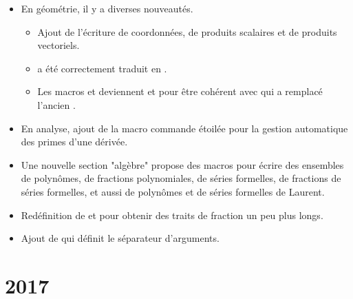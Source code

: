 \documentclass[12pt,a4paper]{book}
\begin{document}
\begin{description}
\begin{itemize}[itemsep=.5em]


    \item En géométrie, il y a diverses nouveautés.
    \begin{itemize}[itemsep=.5em]
        \item Ajout de l'écriture de coordonnées, de produits scalaires et de produits vectoriels.

        \item {} a été correctement traduit en .

        \item Les macros  et  deviennent  et  pour être cohérent avec  qui a remplacé l'ancien .
    \end{itemize}




    \item En analyse, ajout de la macro commande étoilée  pour la gestion automatique des primes d'une dérivée.




    \item Une nouvelle section "algèbre" propose des macros pour écrire des ensembles de polynômes, de fractions polynomiales, de séries formelles, de fractions de séries formelles, et aussi de polynômes et de séries formelles de Laurent.




    \item Redéfinition de  et  pour obtenir des traits de fraction un peu plus longs.




    \item Ajout de  qui définit le séparateur d'arguments.
\end{itemize}

\end{description}



\section{2017}
\end{document}
